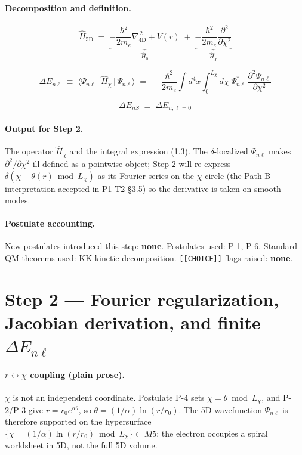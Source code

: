 \documentclass[11pt]{article}
\newcommand{\Hop}{\hat{H}}
\newcommand{\Lchi}{L_\chi}
\newcommand{\me}{m_e}
\begin{document}
\paragraph{Decomposition and definition.}
\begin{equation}
  \Hop_{5\mathrm{D}} \;=\;
  \underbrace{-\frac{\hbar^2}{2\me}\nabla_{4\mathrm{D}}^{\,2} + V(r)}_{\Hop_0}
  \;+\;
  \underbrace{-\frac{\hbar^2}{2\me}\frac{\partial^2}{\partial\chi^2}}_{\Hop_\chi}
  \tag{1.2}
\end{equation}

\begin{equation}
  \Delta E_{n\ell} \;\equiv\;
  \big\langle \Psi_{n\ell} \,\big|\, \Hop_\chi \,\big|\, \Psi_{n\ell} \big\rangle
  \;=\;
  -\frac{\hbar^2}{2\me}\!\int\! d^4x \!\int_0^{\Lchi}\! d\chi \;
    \Psi_{n\ell}^{*} \,\frac{\partial^2 \Psi_{n\ell}}{\partial\chi^2}
  \tag{1.3}
\end{equation}

\begin{equation}
  \Delta E_{nS} \;\equiv\; \Delta E_{n,\ell=0}
  \tag{1.4}
\end{equation}

\paragraph{Output for Step 2.}
The operator $\Hop_\chi$ and the integral expression (1.3). The $\delta$-localized $\Psi_{n\ell}$
makes $\partial^2/\partial\chi^2$ ill-defined as a pointwise object; Step 2 will re-express
$\delta(\chi-\theta(r)\bmod \Lchi)$ as its Fourier series on the $\chi$-circle (the Path-B
interpretation accepted in P1-T2 \S3.5) so the derivative is taken on smooth modes.

\paragraph{Postulate accounting.} New postulates introduced this step: \textbf{none}.
Postulates used: P-1, P-6. Standard QM theorems used: KK kinetic decomposition.
\texttt{[[CHOICE]]} flags raised: \textbf{none}.

\section*{Step 2 --- Fourier regularization, Jacobian derivation, and finite $\Delta E_{n\ell}$}

\paragraph{$r\leftrightarrow\chi$ coupling (plain prose).}
$\chi$ is not an independent coordinate. Postulate P-4 sets $\chi = \theta \bmod \Lchi$, and P-2/P-3
give $r = r_0 e^{\alpha\theta}$, so $\theta = (1/\alpha)\ln(r/r_0)$.  The 5D wavefunction $\Psi_{n\ell}$
is therefore supported on the hypersurface $\{\chi = (1/\alpha)\ln(r/r_0)\bmod\Lchi\} \subset M5$:
the electron occupies a spiral worldsheet in 5D, not the full 5D volume.
\end{document}
